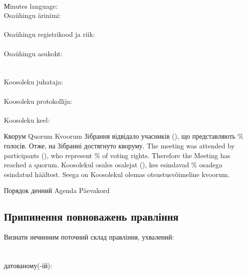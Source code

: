 \begin{Form}
\begin{paracol}{3}
{          \\
          Мinutes language:\\
        }
        { Osaühingu ärinimi:\\
          \\
          Osaühingu registrikood ja riik:\\
          \\
          Osaühingu asukoht:\\
          \\
          \\
          Koosoleku juhataja:\\
          \\
          Koosoleku protokollija:\\
          \\
          Koosoleku keel:\\
        }

      \clause
        {Кворум}
        {Quorum}
        {Kvoorum}
        {Зібрання відвідало  учасників (), що представляють \% голосів. Отже, на Зібранні достягнуто кворуму.}
        {The meeting was attended by  participants (), who represent \% of voting rights. Therefore the Meeting has reached a quorum.}
        {Koosolekul osales  osalejat (), kes esindavad \% osadega esindatud häältest. Seega on Koosolekul olemas otsustusvõimeline kvoorum.}

      \clause
        {Порядок денний}
        {Agenda}
        {Päevakord}
        { \subsection{Припинення повноважень правління}
          Визнати нечинним поточний склад правління, ухвалений:\\
          \\
          \\
          датованому(-ій):\\
}
\end{paracol}
\end{Form}
